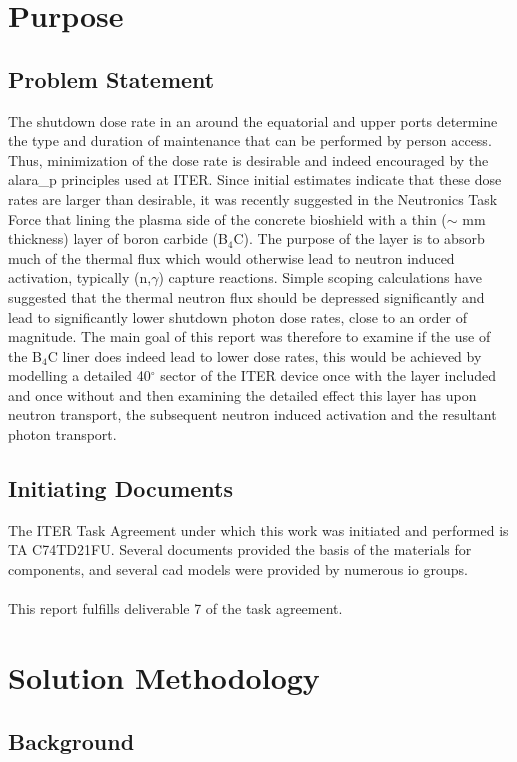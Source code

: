 \documentclass[12pt]{article}
\begin{document}
\newpage
\clearpage
\section{Purpose}
\subsection{Problem Statement}
The shutdown dose rate in an around the equatorial and upper ports determine the
type and duration of maintenance that can be performed by person access. Thus,
minimization of the dose rate is desirable and indeed encouraged by the 
\gls{alara_p} principles used at ITER. Since initial estimates indicate that
these dose rates are larger than desirable, it was recently suggested in the 
Neutronics Task Force that lining the plasma side of the concrete bioshield 
with a thin ($\sim$ mm thickness) layer of boron carbide (B$_4$C). The purpose 
of the layer is to absorb much of the thermal flux which would otherwise lead 
to neutron induced activation, typically (n,$\gamma$) capture reactions. Simple 
scoping calculations have suggested that the thermal neutron flux should be 
depressed significantly and lead to significantly lower shutdown photon dose 
rates, close to an order of magnitude. The main goal of this report was 
therefore to examine if the use of the B$_4$C liner does indeed lead to lower 
dose rates, this would be achieved by modelling a detailed 40$^{\circ}$ sector 
of the ITER device once with the layer included and once without and then 
examining the detailed effect this layer has upon neutron transport, the 
subsequent neutron induced activation and the resultant photon transport.

\subsection{Initiating Documents}
The ITER Task Agreement under which this work was initiated and performed is TA
C74TD21FU. Several documents provided the basis of the materials for components,
and several \gls{cad} models were provided by numerous \gls{io} groups.
\\
\\
This report fulfills deliverable 7 of the task agreement.

\newpage
\section{Solution Methodology}
\subsection{Background}
\end{document}
